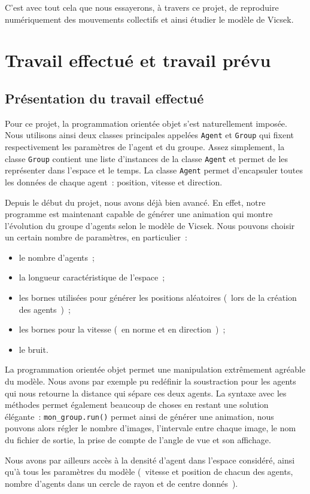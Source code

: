 \documentclass[french, a4paper, 12pt]{article}
\begin{document}
	C'est avec tout cela que nous essayerons, à travers ce projet, de reproduire numériquement des mouvements collectifs et ainsi étudier le modèle de Vicsek.

\section{Travail effectué et travail prévu}
	\subsection{Présentation du travail effectué}
     Pour ce projet, la programmation orientée objet s'est naturellement imposée. Nous utilisons ainsi deux classes principales appelées \verb|Agent| et \verb|Group| qui fixent respectivement les paramètres de l'agent et du groupe. Assez simplement, la classe \verb|Group| contient une liste d'instances de la classe \verb|Agent| et permet de les représenter dans l'espace et le temps. La classe \verb|Agent| permet d'encapsuler toutes les données de chaque agent~: position, vitesse et direction.

     Depuis le début du projet, nous avons déjà bien avancé. En effet, notre programme est maintenant capable de générer une animation qui montre l'évolution du groupe d'agents selon le modèle de Vicsek. Nous pouvons choisir un certain nombre de paramètres, en particulier~:
	 \begin{itemize}
	 	\item le nombre d'agents~;
		\item la longueur caractéristique de l'espace~;
		\item les bornes utilisées pour générer les positions aléatoires (~lors de la création des agents~)~;
		\item les bornes pour la vitesse (~en norme et en direction~)~;
		\item le bruit.
	\end{itemize}
	La programmation orientée objet permet une manipulation extrêmement agréable du modèle. Nous avons par exemple pu redéfinir la soustraction pour les agents qui nous retourne la distance qui sépare ces deux agents. La syntaxe avec les méthodes permet également beaucoup de choses en restant une solution élégante~: \verb|mon_group.run()| permet ainsi de générer une animation, nous pouvons alors régler le nombre d'images, l'intervale entre chaque image, le nom du fichier de sortie, la prise de compte de l'angle de vue et son affichage. 

	Nous avons par ailleurs accès à la densité d'agent dans l'espace considéré, ainsi qu'à tous les paramètres du modèle (~vitesse et position de chacun des agents, nombre d'agents dans un cercle de rayon et de centre donnés~).
	
\end{document}
